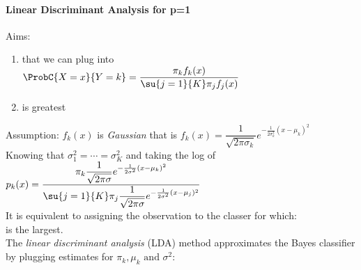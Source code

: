 \paragraph{Linear Discriminant Analysis for p=1}
Aims:
\begin{enumerate}
	\item {} that we can plug 
		into\\ $\ProbC{X=x}{Y=k}=\dfrac{\pi_{k}f_{k}(x)}{\su{{j=1}}{K}\pi_{j}f_{j}(x)}$
	\item {} is greatest
\end{enumerate}
Assumption:
$f_{k}(x)$ is \emph{Gaussian} that is $f_{k}(x)=\dfrac{1}{\sqrt{2\pi\sigma_{k}}}e^{-\frac{1}{2\sigma_{k}^{2}}(x-\mu_{k})^{2}}$\\
Knowing that $\sigma_{1}^{2}= \cdots = \sigma_{K}^{2}$ and taking the log of $p_{k}(x)=\dfrac{\pi_{k}\dfrac{1}{\sqrt{2\pi\sigma}}e^{-\frac{1}{2\sigma^{2}}(x-\mu_{k})^{2}}}{\su{{j=1}}{K}\pi_{j}\dfrac{1}{\sqrt{2\pi\sigma}}e^{-\frac{1}{2\sigma^{2}}(x-\mu_{j})^{2}}}$\\
It is equivalent to assigning the observation to the classer for which:
\\
 is the largest.\\
The \emph{linear discriminant analysis} (LDA) method approximates the
Bayes classifier by plugging estimates for $\pi_{k},\mu_{k}\text{ and }\sigma^{2}$:\\

